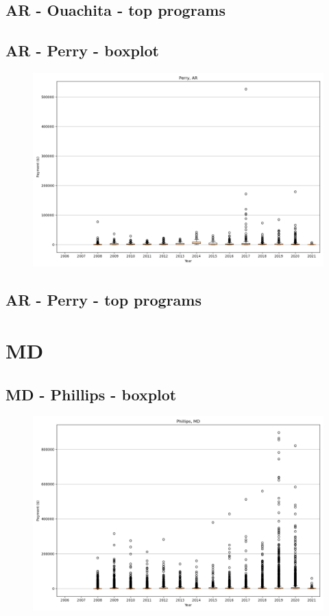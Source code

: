 \subsection*{AR - Ouachita - top programs}

\newpage
\subsection*{AR - Perry - boxplot}
\begin{figure}[h]
\centering
\includegraphics[width=7in]{../output/boxplots/counties/Perry-AR_boxplot.png}
\end{figure}


\subsection*{AR - Perry - top programs}

\newpage
\section*{MD}
\subsection*{MD - Phillips - boxplot}
\begin{figure}[h]
\centering
\includegraphics[width=7in]{../output/boxplots/counties/Phillips-MD_boxplot.png}
\end{figure}


